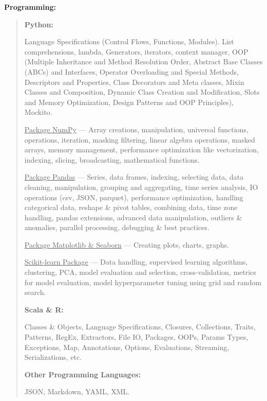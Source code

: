 \documentclass[a4paper]{article}
\begin{document}
\textbf{Programming:}


\begin{quote}
\textbf{Python:}

\begin{adjustwidth}{1.2cm}{} %
Language Specifications (Control Flows, Functions, Modules). List
comprehensions, lambda, Generators, iterators, context manager, OOP
(Multiple Inheritance and Method Resolution Order, Abstract Base Classes
(ABCs) and Interfaces, Operator Overloading and Special Methods,
Descriptors and Properties, Class Decorators and Meta classes, Mixin
Classes and Composition, Dynamic Class Creation and Modification, Slots
and Memory Optimization, Design Patterns and OOP Principles), Mockito.

\ul{Package NumPy} — Array creations, manipulation, universal functions,
operations, iteration, masking filtering, linear algebra operations,
masked arrays, memory management, performance optimization like
vectorization, indexing, slicing, broadcasting, mathematical functions.

\ul{Package Pandas} — Series, data frames, indexing, selecting data,
data cleaning, manipulation, grouping and aggregating, time series
analysis, IO operations (csv, JSON, parquet), performance optimization,
handling categorical data, reshape \& pivot tables, combining data,
time zone handling, pandas extensions, advanced data manipulation,
outliers \& anomalies, parallel processing, debugging \& best practices.

\ul{Package Matplotlib \& Seaborn} — Creating plots, charts, graphs.

\ul{Scikit-learn Package} — Data handling, supervised learning
algorithms, clustering, PCA, model evaluation and selection,
cross-validation, metrics for model evaluation, model hyperparameter
tuning using grid and random search.
\end{adjustwidth}

\vspace{0.2cm}

\textbf{Scala \& R:}

\begin{adjustwidth}{1.2cm}{} %
Classes \& Objects, Language Specifications, Closures, Collections,
Traits, Patterns, RegEx, Extractors, File IO, Packages, OOPs, Params
Types, Exceptions, Map, Annotations, Options, Evaluations, Streaming,
Serializations, etc.
\end{adjustwidth}

\vspace{0.2cm}

\textbf{Other Programming Languages:}

\begin{adjustwidth}{1.2cm}{} %
JSON, Markdown, YAML, XML.
\end{adjustwidth}
\end{quote}
\end{document}
